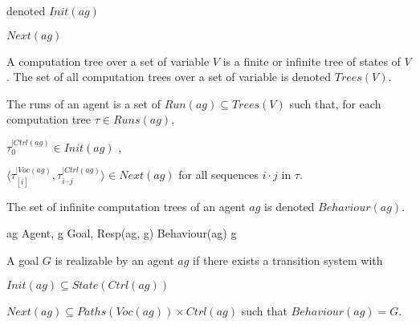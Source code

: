         denoted $Init(ag)$
        
        $Next(ag)$
        
        A computation tree over a set of variable $V$ is a finite or 
        infinite tree of states of $V$. The set of all computation trees over a set 
        of variable is denoted $Trees(V)$.
        
        The runs of an agent is a set of $Run(ag) \subseteq Trees(V)$ such 
        		that, for each computation tree $\tau \in Runs(ag)$,
        \startitemize
        \item $\tau_0^{|Ctrl(ag)} \in Init(ag)$ ,
        \item $\langle\tau_{[i]}^{|Voc(ag)}, \tau_{i\cdot j}^{|Ctrl(ag)}
        		\rangle \in Next(ag)$ for all sequences $i\cdot j$ in $\tau$.
        \stopitemize
        
        The set of infinite computation trees of an agent $ag$ is denoted 
        		$Behaviour(ag)$.
        
        \startformula
         ag \in Agent, g \in Goal,  Resp(ag, g) 
        		 Behaviour(ag) \subseteq g
        \stopformula
        \stopdefinition
        
        A goal $G$ is realizable by an agent $ag$ if there exists a 
        		transition system with
        \startitemize
        \item $Init(ag) \subseteq State(Ctrl(ag))$
        \item $Next(ag) \subseteq Paths(Voc(ag)) \times Ctrl(ag)$
        \stopitemize
        such that $Behaviour(ag) = G$.
        \stopdefinition
        
        \stopsubsection
        
        

        
